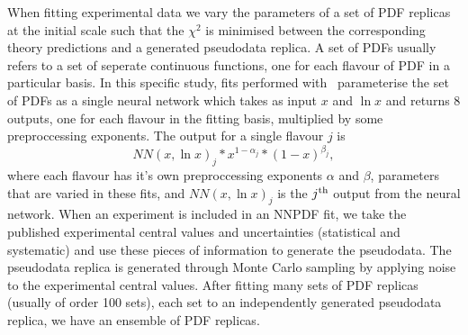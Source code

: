 When fitting experimental data we vary the parameters of a set of PDF replicas
at the initial scale such that the $\chi^2$ is minimised between the
corresponding theory predictions and a generated pseudodata replica. A set of
PDFs usually refers to a set of seperate continuous functions, one for each
flavour of PDF in a particular basis. In this specific study, fits performed
with \nfit\ parameterise the set of PDFs as a single neural network which takes
as input $x$ and $\ln x$ and returns 8 outputs, one for each flavour in the
fitting basis, multiplied by some preproccessing exponents. The output for a
single flavour $j$ is
\begin{equation}
    NN(x, \ln x)_j * x^{1-\alpha_j} * (1-x)^{\beta_j},
\end{equation}
where each flavour has it's own preproccessing exponents $\alpha$ and $\beta$,
parameters that are varied in these fits, and $NN(x, \ln x)_j$ is the
$j^{\rm th}$ output from the neural network.
When an experiment is included in an NNPDF fit, we take the published
experimental central values and uncertainties (statistical and systematic)
and use these pieces of information to generate the pseudodata.
The pseudodata replica is generated
through Monte Carlo sampling by applying noise to the experimental
central values.
After fitting many sets of PDF replicas (usually of order 100 sets),
each set to an independently generated pseudodata replica, we have an ensemble of
PDF replicas.
